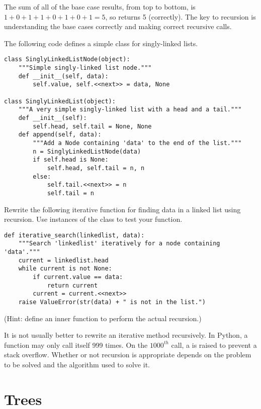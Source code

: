 The sum of all of the base case results, from top to bottom, is $1 + 0 + 1 + 1 + 0 + 1 + 0 + 1 = 5$, so  returns 5 (correctly).
The key to recursion is understanding the base cases correctly and making correct recursive calls.

\begin{problem}
The following code defines a simple class for singly-linked lists.
\begin{lstlisting}
class SinglyLinkedListNode(object):
    """Simple singly-linked list node."""
    def __init__(self, data):
        self.value, self.<<next>> = data, None

class SinglyLinkedList(object):
    """A very simple singly-linked list with a head and a tail."""
    def __init__(self):
        self.head, self.tail = None, None
    def append(self, data):
        """Add a Node containing 'data' to the end of the list."""
        n = SinglyLinkedListNode(data)
        if self.head is None:
            self.head, self.tail = n, n
        else:
            self.tail.<<next>> = n
            self.tail = n
\end{lstlisting}
Rewrite the following iterative function for finding data in a linked list using recursion.
Use instances of the  class to test your function.
\begin{lstlisting}
def iterative_search(linkedlist, data):
    """Search 'linkedlist' iteratively for a node containing 'data'."""
	current = linkedlist.head
	while current is not None:
		if current.value == data:
			return current
		current = current.<<next>>
	raise ValueError(str(data) + " is not in the list.")
\end{lstlisting}
(Hint: define an inner function to perform the actual recursion.)
\end{problem}

\begin{warn}
It is not usually better to rewrite an iterative method recursively.
In Python, a function may only call itself 999 times.
On the $1000^{th}$ call, a  is raised to prevent a stack overflow.
Whether or not recursion is appropriate depends on the problem to be solved and the algorithm used to solve it.
\end{warn}

\section*{Trees}

